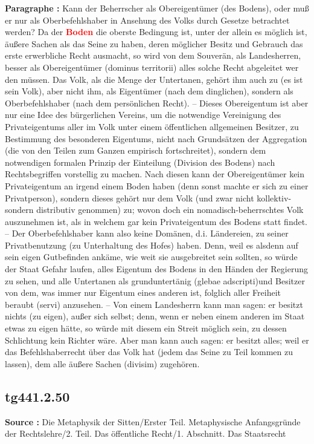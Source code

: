 \documentclass[a4paper,12pt,twoside]{book}
\newcommand{\match}[1]{\textcolor{red}{\textbf{#1}}}
\begin{document}
	\textbf{Paragraphe : }Kann der Beherrscher als Obereigentümer (des Bodens), oder muß er nur als Oberbefehlshaber in Ansehung des Volks durch Gesetze betrachtet werden? Da der \match{Boden} die oberste Bedingung ist, unter der allein es möglich ist, äußere Sachen als das Seine zu haben, deren möglicher Besitz und Gebrauch das erste erwerbliche Recht ausmacht, so wird von dem Souverän, als Landesherren, besser als Obereigentümer (dominus territorii) alles solche Recht abgeleitet wer den müssen. Das Volk, als die Menge der Untertanen, gehört ihm auch zu (es ist sein Volk), aber nicht ihm, als Eigentümer (nach dem dinglichen), sondern als Oberbefehlshaber (nach dem persönlichen Recht). – Dieses Obereigentum ist aber nur eine Idee des bürgerlichen Vereins, um die notwendige Vereinigung des Privateigentums aller im Volk unter einem öffentlichen allgemeinen Besitzer, zu Bestimmung des besonderen Eigentums, nicht nach Grundsätzen der Aggregation (die von den Teilen zum Ganzen empirisch fortschreitet), sondern dem notwendigen formalen Prinzip der Einteilung (Division des Bodens) nach Rechtsbegriffen vorstellig zu machen. Nach diesen kann der Obereigentümer kein Privateigentum an irgend einem Boden haben (denn sonst machte er sich zu einer Privatperson), sondern dieses gehört nur dem Volk (und zwar nicht kollektiv- sondern distributiv genommen) zu; wovon doch ein nomadisch-beherrschtes Volk auszunehmen ist, als in welchem gar kein Privateigentum des Bodens statt findet. – Der Oberbefehlshaber kann also keine Domänen, d.i. Ländereien, zu seiner Privatbenutzung (zu Unterhaltung des Hofes) haben. Denn, weil es alsdenn auf sein eigen Gutbefinden ankäme, wie weit sie ausgebreitet sein sollten, so würde der Staat Gefahr laufen, alles Eigentum des Bodens in den Händen der Regierung zu sehen, und alle Untertanen als grunduntertänig (glebae adscripti)und Besitzer von dem, was immer nur Eigentum eines anderen ist, folglich aller Freiheit beraubt (servi) anzusehen. – Von einem Landesherrn kann man sagen: er besitzt nichts (zu eigen), außer sich selbst; denn, wenn er neben einem anderen im Staat etwas zu eigen hätte, so würde mit diesem ein Streit möglich sein, zu dessen Schlichtung kein Richter wäre. Aber man kann auch sagen: er besitzt alles; weil er das Befehlshaberrecht über das Volk hat (jedem das Seine zu Teil kommen zu lassen), dem alle äußere Sachen (divisim) zugehören. 
	
	\subsection*{tg441.2.50} 
	\textbf{Source : }Die Metaphysik der Sitten/Erster Teil. Metaphysische Anfangsgründe der Rechtslehre/2. Teil. Das öffentliche Recht/1. Abschnitt. Das Staatsrecht\\  
	
\end{document}
